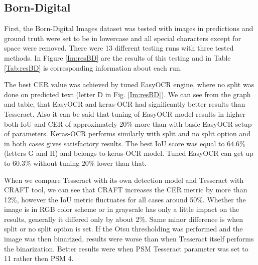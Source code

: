 \newpage
\subsection*{Born-Digital}

First, the Born-Digital Images dataset was tested with images in predictions and ground truth were set to be in lowercase and all special characters except for space were removed. There were 13 different testing runs with three tested methods.  In Figure \ref*{Im:resBD} are the results of this testing and in Table \ref*{Tab:resBD} is corresponding information about each run. 

The best CER value was achieved by tuned EasyOCR engine, where no split was done on predicted text (letter D in Fig. \ref*{Im:resBD}). We can see from the graph and table, that EasyOCR and keras-OCR had significantly better results than Tesseract. Also it can be said that tuning of EasyOCR model results in higher both IoU and CER of approximately 20\% more than with basic EasyOCR setup of parameters. Keras-OCR performs similarly with split and no split option and in both cases gives satisfactory results. The best IoU score was equal to $64.6\%$ (letters G and H) and belongs to keras-OCR model. Tuned EasyOCR can get up to $60.3\%$ without tuning $20\%$ lower than that.

When we compare Tesseract with its own detection model and Tesseract with CRAFT tool, we can see that CRAFT increases the CER metric by more than 12\%, however the IoU metric fluctuates for all cases around 50\%. Whether the image is in RGB color scheme or in grayscale has only a little impact on the results, generally it differed only by about 2\%. Same minor difference is when split or no split option is set. If the Otsu thresholding was performed and the image was then binarized, results were worse than when Tesseract itself performs the binarization. Better results were when PSM Tesseract parameter was set to 11 rather then PSM 4. 

